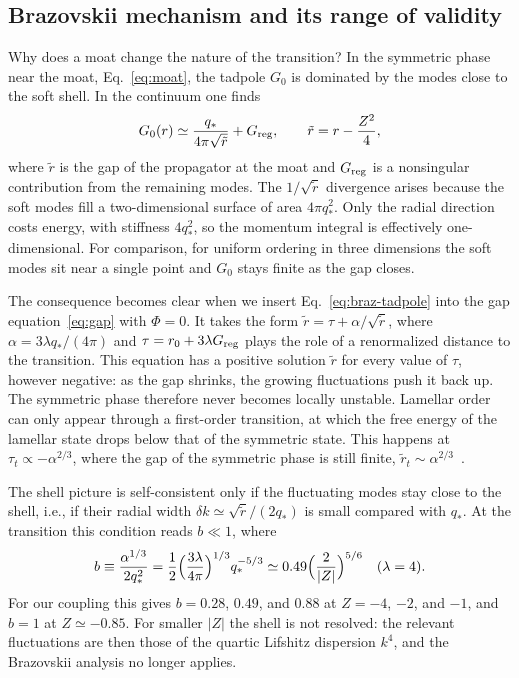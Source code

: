 \documentclass[aps,prd,twocolumn,superscriptaddress,nofootinbib,10pt]{revtex4-2}
\newcommand{\qs}{q_*}
\begin{document}
\subsection{Brazovskii mechanism and its range of validity}
\label{sec:braz}

Why does a moat change the nature of the transition?  In the symmetric phase
near the moat, Eq.~\eqref{eq:moat}, the tadpole $G_0$ is dominated by the
modes close to the soft shell.  In the continuum one finds
\begin{equation}
 G_0(r)\simeq\frac{\qs}{4\pi\sqrt{\tilde r}}+G_{\rm reg},
 \qquad \tilde r=r-\frac{Z^2}{4},
 \label{eq:braz-tadpole}
\end{equation}
where $\tilde r$ is the gap of the propagator at the moat and $G_{\rm reg}$
is a nonsingular contribution from the remaining modes.  The $1/\sqrt{\tilde
r}$ divergence arises because the soft modes fill a two-dimensional surface of
area $4\pi\qs^2$.  Only the radial direction costs energy, with stiffness
$4\qs^2$, so the momentum integral is effectively one-dimensional.  For
comparison, for uniform ordering in three dimensions the soft modes sit near a
single point and $G_0$ stays finite as the gap closes.

The consequence becomes clear when we insert Eq.~\eqref{eq:braz-tadpole} into
the gap equation~\eqref{eq:gap} with $\Phi=0$.  It takes the form
$\tilde r=\tau+\alpha/\sqrt{\tilde r}$, where $\alpha=3\lambda\qs/(4\pi)$ and
$\tau=r_0+3\lambda G_{\rm reg}$ plays the role of a renormalized distance to
the transition.  This equation has a positive solution $\tilde r$ for every
value of $\tau$, however negative: as the gap shrinks, the growing
fluctuations push it back up.  The symmetric phase therefore never becomes
locally unstable.  Lamellar order can only appear through a first-order
transition, at which the free energy of the lamellar state drops below that
of the symmetric state.  This happens at $\tau_t\propto-\alpha^{2/3}$, where
the gap of the symmetric phase is still finite,
$\tilde r_t\sim\alpha^{2/3}$~\cite{Brazovskii1975,Fredrickson1987}.

The shell picture is self-consistent only if the fluctuating modes stay
close to the shell, i.e., if their radial width
$\delta k\simeq\sqrt{\tilde r}/(2\qs)$ is small compared with $\qs$.  At the
transition this condition reads $b\ll1$, where
\begin{equation}
 b\equiv\frac{\alpha^{1/3}}{2\qs^2}
 =\frac12\Bigl(\frac{3\lambda}{4\pi}\Bigr)^{1/3}\qs^{-5/3}
 \simeq0.49\Bigl(\frac{2}{|Z|}\Bigr)^{5/6}
 \quad(\lambda=4).
 \label{eq:bpar}
\end{equation}
For our coupling this gives $b=0.28$, $0.49$, and $0.88$ at $Z=-4$, $-2$, and
$-1$, and $b=1$ at $Z\simeq-0.85$.  For smaller $|Z|$ the shell is not
resolved: the relevant fluctuations are then those of the quartic Lifshitz
dispersion $k^4$, and the Brazovskii analysis no longer applies.
\end{document}
